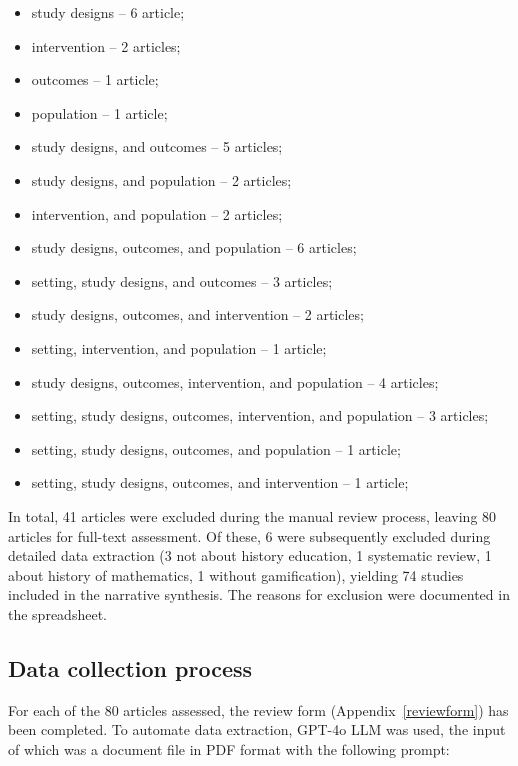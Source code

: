 \documentclass[a4paper,fleqn]{cas-sc}
\begin{document}
\begin{itemize}[noitemsep]
 \item study designs -- 6 article;
 \item intervention -- 2 articles;
 \item outcomes -- 1 article;
 \item population -- 1 article;

 \item study designs, and outcomes -- 5 articles;
 \item study designs, and population -- 2 articles;
 \item intervention, and population -- 2 articles;

 \item study designs, outcomes, and population -- 6 articles;
 \item setting, study designs, and outcomes -- 3 articles;
 \item study designs, outcomes, and intervention -- 2 articles;
 \item setting, intervention, and population -- 1 article;

 \item study designs, outcomes, intervention, and population -- 4 articles;
 \item setting, study designs, outcomes, intervention, and population -- 3 articles;
 \item setting, study designs, outcomes, and population -- 1 article;
 \item setting, study designs, outcomes, and intervention -- 1 article;
\end{itemize}


In total, 41 articles were excluded during the manual review process, leaving 80 articles for full-text assessment. Of these, 6 were subsequently excluded during detailed data extraction (3 not about history education, 1 systematic review, 1 about history of mathematics, 1 without gamification), yielding 74 studies included in the narrative synthesis. The reasons for exclusion were documented in the spreadsheet.



\subsection{Data collection process}
For each of the 80 articles assessed, the review form (Appendix~\ref{reviewform}) has been completed. To automate data extraction, GPT-4o LLM was used, the input of which was a document file in PDF format with the following prompt:
\end{document}
